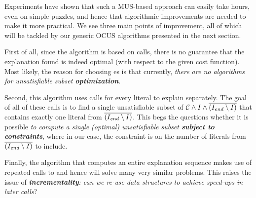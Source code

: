 Experiments have shown that such a MUS-based approach can easily take hours, even on simple puzzles, and hence that algorithmic improvements are needed to make it more practical. 
We see three main points of improvement, all of which will be tackled by our generic OCUS algorithms presented in the next section. 
\begin{inparaenum}
 \item First of all, since the algorithm is based on  calls, there is no guarantee that the explanation found is indeed optimal %
 (with respect to the given cost function). 
 Most likely, the reason for choosing es is that currently, \textit{there are no algorithms for unsatisfiable subset \textbf{optimization}}. 
 \item Second, this algorithm uses  calls for every literal to explain separately. The goal of all of these calls is to find a single unsatisfiable subset of $\mathcal{C}  \land I \land \overline{(I_\mathit{end} \setminus I)}$ that contains exactly one literal from $\overline{(I_\mathit{end} \setminus I)}$. This begs the questions whether it is possible \textit{to compute a single (optimal) unsatisfiable subset \textbf{subject to constraints}}, where in our case, the constraint is on the number of literals from $\overline{(I_\mathit{end} \setminus I)}$ to include. 
 \item Finally, the algorithm that computes an entire explanation sequence makes use of repeated calls to \onestep and hence will solve many very similar problems. This raises the issue of \textit{\textbf{incrementality}: can we re-use data structures to achieve speed-ups in later calls}? 
\end{inparaenum}




